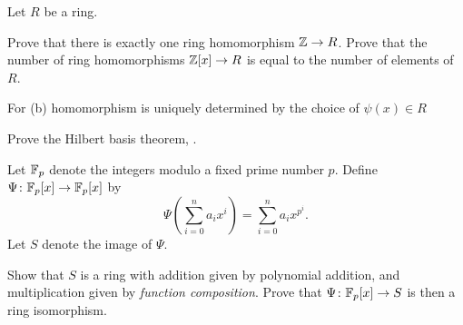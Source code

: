 \begin{problem}
	Let $R$ be a ring.
	\begin{enumerate}[(a)]
		\ii Prove that there is exactly one ring homomorphism $\mathbb Z \to R$.
		\ii Prove that the number of ring homomorphisms
		$\mathbb Z[x] \to R$ is equal to the number of elements of $R$.
	\end{enumerate}
	\begin{hint}
		For (b) homomorphism is uniquely determined by the choice of $\psi(x) \in R$
	\end{hint}
\end{problem}


\begin{problem}
	\gim
	Prove the Hilbert basis theorem, .
\end{problem}

\begin{problem}
	Let $\mathbb F_p$ denote the integers modulo a fixed prime number $p$.
	Define $\Psi \colon \mathbb F_p[x] \to \mathbb F_p[x]$ by
	\[ \Psi\left( \sum_{i=0}^n a_i x^i \right) = \sum_{i=0}^n a_i x^{p^i}. \]
	Let $S$ denote the image of $\Psi$.
	\begin{enumerate}[(a)]
		\ii Show that $S$ is a ring with addition
		given by polynomial addition,
		and multiplication given by \emph{function composition}.
		\ii Prove that $\Psi \colon \mathbb F_p[x] \to S$
		is then a ring isomorphism.
	\end{enumerate}
\end{problem}


